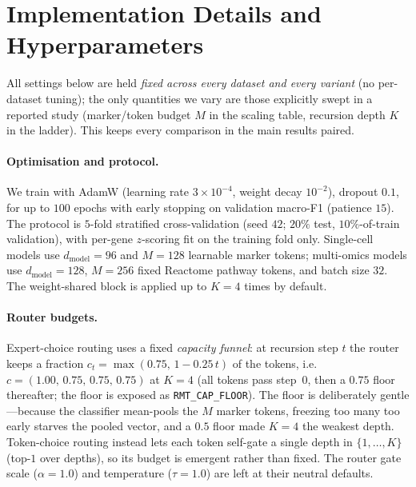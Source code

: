 \documentclass[letterpaper]{article}
\begin{document}
\section{Implementation Details and Hyperparameters}
\label{app:hparams}
All settings below are held \emph{fixed across every dataset and every variant} (no per-dataset
tuning); the only quantities we vary are those explicitly swept in a reported study (marker/token
budget $M$ in the scaling table, recursion depth $K$ in the ladder). This keeps every comparison in
the main results paired.

\paragraph{Optimisation and protocol.}
We train with AdamW (learning rate $3\times10^{-4}$, weight decay $10^{-2}$), dropout $0.1$, for up
to $100$ epochs with early stopping on validation macro-F1 (patience $15$). The protocol is
$5$-fold stratified cross-validation (seed $42$; $20\%$ test, $10\%$-of-train validation), with
per-gene $z$-scoring fit on the training fold only. Single-cell models use $d_{\mathrm{model}}{=}96$
and $M{=}128$ learnable marker tokens; multi-omics models use $d_{\mathrm{model}}{=}128$, $M{=}256$
fixed Reactome pathway tokens, and batch size $32$. The weight-shared block is applied up to
$K{=}4$ times by default.

\paragraph{Router budgets.}
Expert-choice routing uses a fixed \emph{capacity funnel}: at recursion step $t$ the router keeps a
fraction $c_t=\max(0.75,\,1-0.25\,t)$ of the tokens, i.e.\ $c=(1.00,\,0.75,\,0.75,\,0.75)$ at
$K{=}4$ (all tokens pass step~$0$, then a $0.75$ floor thereafter; the floor is exposed as
\texttt{RMT\_CAP\_FLOOR}). The floor is deliberately gentle---because the classifier mean-pools the
$M$ marker tokens, freezing too many too early starves the pooled vector, and a $0.5$ floor made
$K{=}4$ the weakest depth. Token-choice routing instead lets each token self-gate a single depth in
$\{1,\dots,K\}$ (top-$1$ over depths), so its budget is emergent rather than fixed. The router gate
scale ($\alpha{=}1.0$) and temperature ($\tau{=}1.0$) are left at their neutral defaults.
\end{document}
